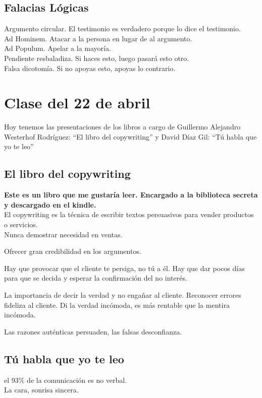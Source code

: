 \documentclass[12pt, a4paper, twoside]{article}
\begin{document}
\subsection{Falacias Lógicas}

Argumento circular. El testimonio es verdadero porque lo dice el testimonio.\\
Ad Hominem. Atacar a la persona en lugar de al argumento.\\
Ad Populum. Apelar a la mayoría.\\
Pendiente resbaladiza. Si haces esto, luego pasará esto otro.\\
Falsa dicotomía. Si no apoyas esto, apoyas lo contrario.\\




\section{Clase del 22 de abril}
Hoy tenemos las presentaciones de los libros a cargo de Guillermo Alejandro Westerhof
Rodríguez: ``El libro del copywriting'' y David Díaz Gil: ``Tú habla que yo te
leo''

\subsection{El libro del copywriting}

\textbf{Este es un libro que me gustaría leer. Encargado a la biblioteca secreta
y descargado en el kindle.}\\

El copywriting es la técnica de escribir textos persuasivos para vender productos o servicios.\\
Nunca demostrar necesidad en ventas.

Ofrecer gran credibilidad en los argumentos.

Hay que provocar que el cliente te persiga, no tú a él. 
Hay que dar pocos días para que se decida y esperar la confirmación del no interés.

La importancia de decir la verdad y no engañar al cliente. Reconocer errores
fideliza al cliente. Di la verdad incómoda, es más rentable que la mentira 
incómoda.

Las razones auténticas persuaden, las falsas desconfianza.

\subsection{Tú habla que yo te leo}
el 93\% de la comunicación es no verbal.\\
La cara, sonrisa sincera.
\end{document}
